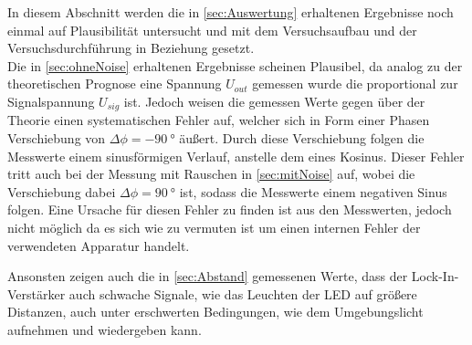 In diesem Abschnitt werden die in \cref{sec:Auswertung} erhaltenen Ergebnisse noch einmal 
auf Plausibilität untersucht und mit dem Versuchsaufbau und der Versuchsdurchführung in Beziehung
gesetzt.\\


Die in \cref{sec:ohneNoise}  erhaltenen Ergebnisse scheinen Plausibel, da analog zu der theoretischen
Prognose eine Spannung $U_{out}$ gemessen wurde die proportional zur Signalspannung $U_{sig}$ ist.
Jedoch weisen die gemessen Werte gegen über der Theorie einen systematischen Fehler auf,
welcher sich in Form einer Phasen Verschiebung von $\Delta\phi = \SI{-90}{\degree}$ äußert. Durch diese
Verschiebung folgen die Messwerte einem sinusförmigen Verlauf, anstelle dem eines Kosinus.  
Dieser Fehler tritt auch bei der Messung mit Rauschen in \cref{sec:mitNoise} auf, wobei die Verschiebung
dabei $ \Delta\phi = \SI{90}{\degree}$ ist, sodass die Messwerte einem negativen Sinus folgen.
Eine Ursache für diesen Fehler zu finden ist aus den Messwerten, jedoch nicht möglich da es sich
wie zu vermuten ist um einen internen Fehler der verwendeten Apparatur handelt.

Ansonsten zeigen auch die in \cref{sec:Abstand} gemessenen Werte, dass der Lock-In-Verstärker 
auch schwache Signale, wie das Leuchten der LED auf größere Distanzen, auch unter erschwerten Bedingungen,
wie dem Umgebungslicht aufnehmen und wiedergeben kann.
 

